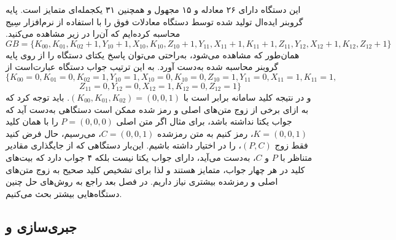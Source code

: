 این دستگاه دارای ۲۶ معادله و ۱۵ مجهول و همچنین ۳۱ یکجمله‌ای متمایز است. پایه گروبنر ایده‌ال تولید شده توسط دستگاه معادلات فوق را با استفاده از نرم‌افزار سِیج محاسبه کرده‌ایم که آن‌را در زیر مشاهده می‌کنید. 
{\small $$GB = 
\{K_{00}, K_{01}, K_{02} + 1, Y_{10} + 1, X_{10}, K_{10}, Z_{10} + 1, Y_{11}, X_{11} + 1, K_{11} + 1, Z_{11}, Y_{12}, X_{12} + 1, K_{12}, Z_{12} + 1\}$$}
همان‌طور که مشاهده می‌شود، به‌راحتی می‌توان پاسخ  یکتای دستگاه  را از روی پایه گروبنر محاسبه شده به‌دست آورد. به این ترتیب جواب دستگاه عبارت‌است از
{\small 
$$\{K_{00} = 0, K_{01} = 0, K_{02} = 1, Y_{10} = 1, X_{10} = 0, K_{10} = 0, Z_{10} = 1, Y_{11} = 0, X_{11} = 1, K_{11} = 1,$$
$$Z_{11} = 0, Y_{12} = 0, X_{12} = 1, K_{12} = 0, Z_{12} = 1\}$$
}
و در نتیجه کلید سامانه برابر است با 
$(K_{00},K_{01},K_{02}) = (0,0,1)$. 
 باید توجه کرد که به ازای برخی از زوج متن‌های اصلی و رمز شده ممکن است دستگاهی به‌دست آید که جواب یکتا نداشته باشد، برای مثال اگر متن اصلی 
$P = (0, 0, 0)$ 
را با همان کلید 
$K = (0, 0, 1)$، 
رمز کنیم به متن رمزشده 
$C = (0, 0, 1)$، 
می‌رسیم، حال فرض کنید فقط زوج 
$(P, C)$، 
را در اختیار داشته باشیم. این‌بار دستگاهی که از جایگذاری مقادیر متناظر با 
$P$
و
$C$، 
به‌دست می‌آید، دارای جواب یکتا نیست بلکه ۴ جواب  دارد که بیت‌های کلید در هر چهار جواب، متمایز هستند و لذا برای تشخیص کلید صحیح به زوج متن‌های اصلی و رمزشده بیشتری نیاز داریم.  در فصل بعد راجع به روش‌های حل چنین دستگاه‌هایی بیشتر بحث می‌کنیم. 

\subsection{جبری‌سازی   و  }

